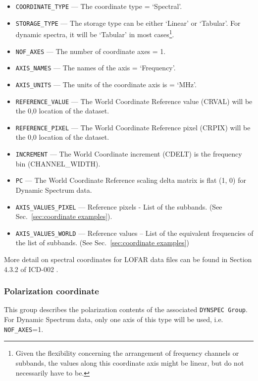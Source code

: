 \documentclass[a4paper,10pt,bibtotoc]{scrartcl}
\begin{document}
\begin{itemize}
  \item \verb|COORDINATE_TYPE| ---
  The coordinate type = `Spectral'.
  \item \verb|STORAGE_TYPE| ---
  The storage type can be either `Linear' or `Tabular'. For dynamic spectra, 
  it will be `Tabular' in most cases\footnote{ Given the flexibility concerning the arrangement of frequency 
channels or subbands, the values along this coordinate axis might be linear, but do
not necessarily have to be.}.
  \item \verb|NOF_AXES| ---
  The number of coordinate axes = 1.
  \item \verb|AXIS_NAMES| ---
  The names of the axis = `Frequency'.
  \item \verb|AXIS_UNITS| ---
  The units of the coordinate axis is = `MHz'.
  \item \verb|REFERENCE_VALUE| ---
  The World Coordinate Reference value (CRVAL) will be the 0,0 location of the dataset.
  \item \verb|REFERENCE_PIXEL| ---
  The World Coordinate Reference pixel (CRPIX) will be the 0,0 location of the dataset.
  \item \verb|INCREMENT| ---
  The World Coordinate increment (CDELT) is the frequency bin (CHANNEL\_WIDTH).
  \item \verb|PC| ---
  The World Coordinate Reference scaling delta matrix is flat (1, 0) for Dynamic Spectrum data.
  \item \verb|AXIS_VALUES_PIXEL| ---
  Reference pixels - List of the subbands. (See Sec.~\ref{sec:coordinate examples}).
  \item \verb|AXIS_VALUES_WORLD| ---
  Reference values -- List of the equivalent frequencies of the list
  of subbands. (See Sec.~\ref{sec:coordinate examples})
\end{itemize}

More detail on spectral coordinates for LOFAR data files can be found in 
Section 4.3.2 of ICD-002 \cite{lofar.icd.002}. 


\subsubsection{Polarization coordinate}
\label{sec:stokes coordinate}

This group describes the polarization contents of the associated 
\texttt{DYNSPEC Group}.
For Dynamic Spectrum data, only one axis of this type will be used, i.e. 
\verb|NOF_AXES|=1.
\end{document}
